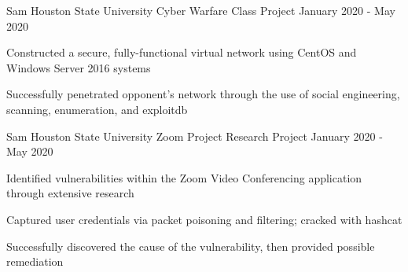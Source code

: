 
\begin{cventries}


	\cventry
	  {Sam Houston State University} %
  	  {Cyber Warfare} %
	  {Class Project} %
	  {January 2020 - May 2020} %
	  {
	    \begin{cvitems} %
			\item {Constructed a secure, fully-functional virtual network using CentOS and Windows Server 2016 systems}
			\item {Successfully penetrated opponent's network through the use of social engineering, scanning, enumeration, and exploitdb}
		\end{cvitems}
	  }

	\cventry
	  {Sam Houston State University} %
      {Zoom Project} %
	  {Research Project} %
	  {January 2020 - May 2020} %
	  {
	    \begin{cvitems} %
			\item {Identified vulnerabilities within the Zoom Video Conferencing application through extensive research}
			\item {Captured user credentials via packet poisoning and filtering; cracked with hashcat}
			\item {Successfully discovered the cause of the vulnerability, then provided possible remediation }
		\end{cvitems}
	  }


\end{cventries}
